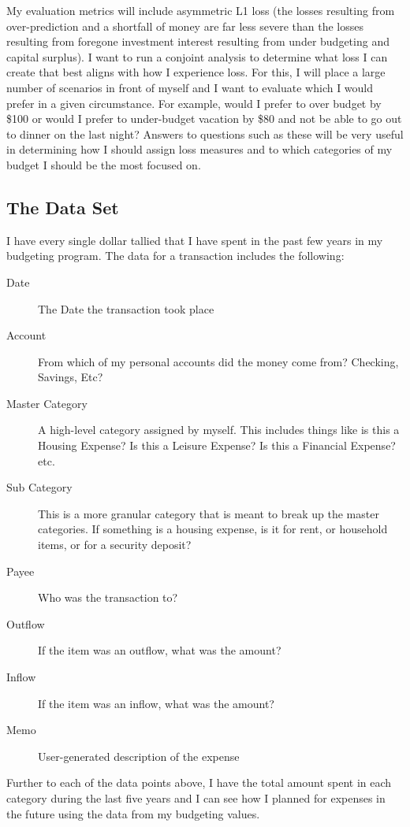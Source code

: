 \documentclass[11pt,a4paper]{article}
\begin{document}
My evaluation metrics will include asymmetric L1 loss (the losses resulting from over-prediction and a shortfall of money are far less severe than the losses resulting from foregone investment interest resulting from under budgeting and capital surplus). I want to run a conjoint analysis to determine what loss I can create that best aligns with how I experience loss. For this, I will place a large number of scenarios in front of myself and I want to evaluate which I would prefer in a given circumstance. For example, would I prefer to over budget by \$100 or would I prefer to under-budget vacation by \$80 and not be able to go out to dinner on the last night? Answers to questions such as these will be very useful in determining how I should assign loss measures and to which categories of my budget I should be the most focused on. 

\subsection{The Data Set}
I have every single dollar tallied that I have spent in the past few years in my budgeting program. The data for a transaction includes the following:
\begin{description}
	\item[Date] The Date the transaction took place
	\item[Account] From which of my personal accounts did the money come from? Checking, Savings, Etc?
	\item[Master Category] A high-level category assigned by myself. This includes things like is this a Housing Expense? Is this a Leisure Expense? Is this a Financial Expense? etc.
	\item[Sub Category] This is a more granular category that is meant to break up the master categories. If something is a housing expense, is it for rent, or household items, or for a security deposit?
	\item[Payee] Who was the transaction to?
	\item[Outflow] If the item was an outflow, what was the amount?
	\item[Inflow] If the item was an inflow, what was the amount?
	\item[Memo] User-generated description of the expense
\end{description}

Further to each of the data points above, I have the total amount spent in each category during the last five years and I can see how I planned for expenses in the future using the data from my budgeting values. 
\end{document}
